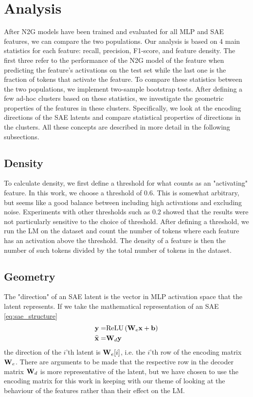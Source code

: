 \section{Analysis}
After N2G models have been trained and evaluated for all MLP and SAE features, we can compare the two populations.
Our analysis is based on 4 main statistics for each feature: recall, precision, F1-score, and feature density.
The first three refer to the performance of the N2G model of the feature when predicting the feature's activations on the test set while the last one is the fraction of tokens that activate the feature.
To compare these statistics between the two populations, we implement two-sample bootstrap tests.
After defining a few ad-hoc clusters based on these statistics, we investigate the geometric properties of the features in these clusters.
Specifically, we look at the encoding directions of the SAE latents and compare statistical properties of directions in the clusters.
All these concepts are described in more detail in the following subsections.

\subsection{Density}
\label{sec:density}
To calculate density, we first define a threshold for what counts as an "activating" feature.
In this work, we choose a threshold of $0.6$.
This is somewhat arbitrary, but seems like a good balance between including high activations and excluding noise.
Experiments with other thresholds such as $0.2$ showed that the results were not particularly sensitive to the choice of threshold.
After defining a threshold, we run the LM on the dataset and count the number of tokens where each feature has an activation above the threshold.
The density of a feature is then the number of such tokens divided by the total number of tokens in the dataset.

\subsection{Geometry}
\label{sec:methods_geometry}
The "direction" of an SAE latent is the vector in MLP activation space that the latent represents.
If we take the mathematical representation of an SAE \eqref{eq:sae_structure} 
\begin{align*}
    \mathbf{y}=&\mathrm{ReLU}\left(\mathbf{W}_e\mathbf{x}+\mathbf{b}\right)\\
    \widehat{\mathbf{x}}=&\mathbf{W}_d\mathbf{y}
\end{align*}
the direction of the $i$'th latent is $\mathbf{W}_e[i]$, i.e. the $i$'th row of the encoding matrix $\mathbf{W}_e$.
There are arguments to be made\parencite{nanda_open_2023} that the respective row in the decoder matrix $\mathbf{W}_d$ is more representative of the latent, but we have chosen to use the encoding matrix for this work in keeping with our theme of looking at the behaviour of the features rather than their effect on the LM.

